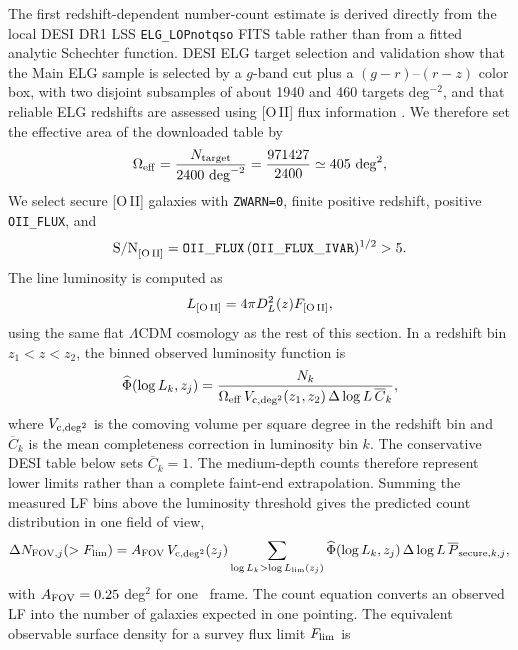 The first redshift-dependent number-count estimate is derived directly from the local DESI DR1 LSS \texttt{ELG\_\allowbreak LOPnotqso} FITS table rather than from a fitted analytic Schechter function. DESI ELG target selection and validation show that the Main ELG sample is selected by a $g$-band cut plus a $(g-r)$--$(r-z)$ color box, with two disjoint subsamples of about 1940 and 460 targets deg$^{-2}$, and that reliable ELG redshifts are assessed using [O\,II] flux information \cite{raichoor2022}. We therefore set the effective area of the downloaded table by
\begin{equation}
  \Omega_{\rm eff}=
  \frac{N_{\rm target}}{2400\ {\rm deg}^{-2}}
  =
  \frac{971427}{2400}
  \simeq405\ {\rm deg}^{2},
\end{equation}
We select secure [O\,II] galaxies with \texttt{ZWARN=0}, finite positive redshift, positive \texttt{OII\_FLUX}, and
\begin{equation}
  {\rm S/N}_{\rm [O\,II]}=
  {\tt OII\_FLUX}\,({\tt OII\_FLUX\_IVAR})^{1/2}>5 .
\end{equation}
The line luminosity is computed as
\begin{equation}
  L_{\rm [O\,II]}=4\pi D_L^2(z)F_{\rm [O\,II]},
\end{equation}
using the same flat $\Lambda$CDM cosmology as the rest of this section. In a redshift bin $z_1<z<z_2$, the binned observed luminosity function is
\begin{equation}
  \widehat{\Phi}(\log L_k,z_j)=
  \frac{N_k}
  {\Omega_{\rm eff}\,V_{\rm c,deg^2}(z_1,z_2)\,\Delta\log L\,\overline{C}_k},
\end{equation}
where $V_{\rm c,deg^2}$ is the comoving volume per square degree in the redshift bin and $\overline{C}_k$ is the mean completeness correction in luminosity bin $k$. The conservative DESI table below sets $\overline{C}_k=1$. The medium-depth counts therefore represent lower limits rather than a complete faint-end extrapolation. Summing the measured LF bins above the luminosity threshold gives the predicted count distribution in one field of view,
\begin{equation}
  \Delta N_{{\rm FOV},j}(>F_{\rm lim}) =
  A_{\rm FOV}\,
  V_{\rm c,deg^2}(z_j)
  \sum_{\log L_k>\log L_{\rm lim}(z_j)}
  \widehat{\Phi}(\log L_k,z_j)\,
  \Delta\log L\,
  \overline{P}_{{\rm secure},k,j},
\end{equation}
with $A_{\rm FOV}=0.25$ deg$^2$ for one \fovlarge\ frame. The count equation converts an observed LF into the number of galaxies expected in one pointing. The equivalent observable surface density for a survey flux limit $F_{\rm lim}$ is
